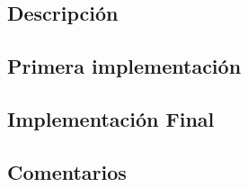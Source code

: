 \documentclass{report}
\begin{document}
        \subsection*{Descripción}
          \paragraph*{}{

          }
        \subsection*{Primera implementación}
          \paragraph*{}{

          }
        \subsection*{Implementación Final}
          \paragraph*{}{

          }
        \subsection*{Comentarios}
          \paragraph*{}{

          }
\end{document}
